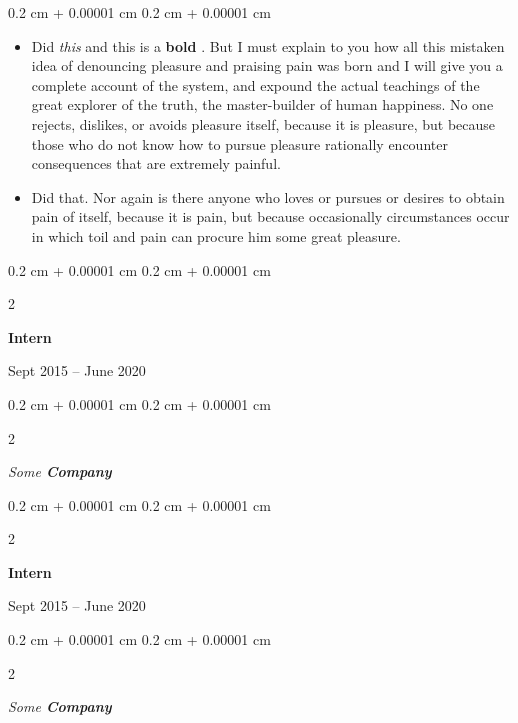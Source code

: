 \documentclass[10pt, letterpaper]{article}
\newenvironment{highlights}{
    \begin{itemize}[
        topsep=0.10 cm,
        parsep=0.10 cm,
        partopsep=0pt,
        itemsep=0pt,
        leftmargin=0.4 cm + 10pt
    ]
}{
    \end{itemize}
} %
\newenvironment{onecolentry}{
    \begin{adjustwidth}{
        0.2 cm + 0.00001 cm
    }{
        0.2 cm + 0.00001 cm
    }
}{
    \end{adjustwidth}
} %
\newenvironment{twocolentry}[2][]{
    \onecolentry
    \def\secondColumn{#2}
    \setcolumnwidth{\fill, 4.5 cm}
    \begin{paracol}{2}
}{
    \switchcolumn \raggedleft \secondColumn
    \end{paracol}
    \endonecolentry
} %
\let\hrefWithoutArrow\href
\renewcommand{\href}[2]{\hrefWithoutArrow{#1}{\ifthenelse{\equal{#2}{}}{ }{#2 }\raisebox{.15ex}{\footnotesize \faExternalLink*}}}
\begin{document}
        \vspace{0.10 cm}
        \begin{onecolentry}
            \begin{highlights}
                \item Did \textit{this} and this is a \textbf{bold} \href{https://example.com}{link}. But I must explain to you how all this mistaken idea of denouncing pleasure and praising pain was born and I will give you a complete account of the system, and expound the actual teachings of the great explorer of the truth, the master-builder of human happiness. No one rejects, dislikes, or avoids pleasure itself, because it is pleasure, but because those who do not know how to pursue pleasure rationally encounter consequences that are extremely painful.
                \item Did that. Nor again is there anyone who loves or pursues or desires to obtain pain of itself, because it is pain, but because occasionally circumstances occur in which toil and pain can procure him some great pleasure.
            \end{highlights}
        \end{onecolentry}


        \vspace{0.2 cm}

                \begin{twocolentry}{
                    Sept 2015 – June 2020
                }
                \textbf{Intern}
                \end{twocolentry}
            \begin{twocolentry}{
            }
            \textit{Some \textbf{Company}}
            \end{twocolentry}



        \vspace{0.2 cm}

                \begin{twocolentry}{
                    Sept 2015 – June 2020
                }
                \textbf{Intern}
                \end{twocolentry}
            \begin{twocolentry}{
            }
            \textit{Some \textbf{Company}}
            \end{twocolentry}
\end{document}
